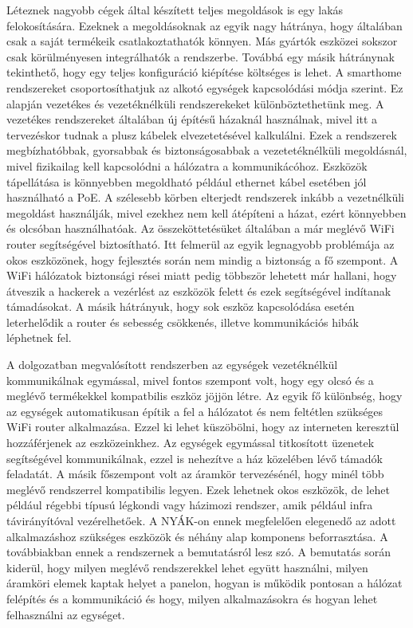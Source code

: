 Léteznek nagyobb cégek által készített teljes megoldások is egy lakás felokosítására. Ezeknek a megoldásoknak az egyik nagy hátránya, hogy általában csak a saját termékeik csatlakoztathatók könnyen. Más gyártók eszközei sokszor csak körülményesen integrálhatók a rendszerbe. Továbbá egy másik hátránynak tekinthető, hogy egy teljes konfiguráció kiépítése költséges is lehet. A smarthome rendszereket csoportosíthatjuk az alkotó egységek kapcsolódási módja szerint. Ez alapján vezetékes és vezetéknélküli rendszerekeket különböztethetünk meg. A vezetékes rendszereket általában új építésű házaknál használnak, mivel itt a tervezéskor tudnak a plusz kábelek elvezetetésével kalkulálni. Ezek a rendszerek megbízhatóbbak, gyorsabbak és biztonságosabbak a vezetetéknélküli megoldásnál, mivel fizikailag kell kapcsolódni a hálózatra a kommunikácóhoz. Eszközök tápellátása is könnyebben megoldható például ethernet kábel esetében jól használható a PoE. A szélesebb körben elterjedt rendszerek inkább a vezetnélküli megoldást használják, mivel ezekhez nem kell átépíteni a házat, ezért könnyebben és olcsóban használhatóak. Az összeköttetésüket általában a már meglévő WiFi router segítségével biztosítható. Itt felmerül az egyik legnagyobb problémája az okos eszközönek, hogy fejlesztés során nem mindig a biztonság a fő szempont. A WiFi hálózatok biztonsági rései miatt pedig többször lehetett már hallani, hogy átveszik a hackerek a vezérlést az eszközök felett és ezek segítségével indítanak támadásokat. A másik hátrányuk, hogy sok eszköz kapcsolódása esetén leterhelődik a router és sebesség csökkenés, illetve kommunikációs hibák léphetnek fel.

A dolgozatban megvalósított rendszerben az egységek vezetéknélkül kommunikálnak egymással, mivel fontos szempont volt, hogy egy olcsó és a meglévő termékekkel kompatbilis eszköz jöjjön létre. Az egyik fő különbség, hogy az egységek automatikusan építik a fel a hálózatot és nem feltétlen szükséges WiFi router alkalmazása. Ezzel ki lehet küszöbölni, hogy az interneten keresztül hozzáférjenek az eszközeinkhez. Az egységek egymással titkosított üzenetek segítségével kommunikálnak, ezzel is nehezítve a ház közelében lévő támadók feladatát. A másik főszempont volt az áramkör tervezésénél, hogy minél több meglévő rendszerrel kompatibilis legyen. Ezek lehetnek okos eszközök, de lehet például régebbi típusú légkondi vagy házimozi rendszer, amik például infra távirányítóval vezérelhetőek. A NYÁK-on ennek megfelelően elegenedő az adott alkalmazáshoz szükséges eszközök és néhány alap komponens beforrasztása.
A továbbiakban ennek a rendszernek a bemutatásról lesz szó. A bemutatás során kiderül, hogy milyen meglévő rendszerekkel lehet együtt használni, milyen áramköri elemek kaptak helyet a panelon, hogyan is működik pontosan a hálózat felépítés és a kommunikáció és hogy, milyen alkalmazásokra és hogyan lehet felhasználni az egységet. 


